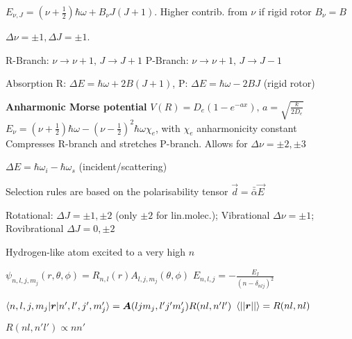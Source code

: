 \begin{squishlist}
    \item $E_{\nu, J} = (\nu + \frac{1}{2}) \hbar \omega + B_{\nu} J(J+1)$. Higher contrib. from $\nu$ \squishsep if rigid rotor $B_{\nu} = B$
    \item $\Delta \nu = \pm 1, \Delta J = \pm 1$.
    \item R-Branch: $\nu \rightarrow \nu + 1,\, J \rightarrow J+1$ \quad P-Branch:  $\nu \rightarrow \nu + 1, \,  J \rightarrow J-1$
    \item Absorption \quad R: $\Delta E = \hbar \omega + 2B(J+1)$, P: $\Delta E = \hbar \omega - 2BJ$ (rigid rotor)
    \item \textbf{Anharmonic Morse potential} $V(R) = D_e (1 - e^{-ax}), \, a = \sqrt{\frac{k}{2D_e}}$ \\
    $E_{\nu} = (\nu+\frac{1}{2}) \hbar \omega - (\nu - \frac{1}{2})^2 \hbar \omega \chi_e$, with $\chi_e$ anharmonicity constant \\
    Compresses R-branch and stretches P-branch. Allows for $\Delta \nu = \pm 2, \pm 3$
\end{squishlist}

\begin{squishlist}
    \item $\Delta E = \hbar \omega_i - \hbar \omega_s$ (incident/scattering)
    \item Selection rules are based on the polarisability tensor $\vec{d} = \bar{\bar{\alpha}} \vec{E}$
    \item Rotational: $\Delta J = \pm 1, \pm 2$ (only $\pm 2$ for lin.molec.); Vibrational $\Delta \nu  =\pm 1$; \\ Rovibrational $\Delta J = 0, \pm 2$
\end{squishlist}

Hydrogen-like atom excited to a very high $n$
\begin{squishlist}
    \item $\psi_{n,l,j,m_j}(r,\theta, \phi) = R_{n,l}(r) A_{l,j,m_j}(\theta,\phi)$ \quad $E_{n,l,j} = - \frac{E_I}{(n - \delta_{nlj})^2}$
    \item $\braket{n,l,j,m_j|\bm{r}|n',l',j',m_j'} = \bm{A}(ljm_j, l'j'm_j')R(nl,n'l')$ \quad $\braket{||\bm{r}||} = R(nl,nl)$
    \item $R(nl,n'l') \propto nn'$
\end{squishlist}

